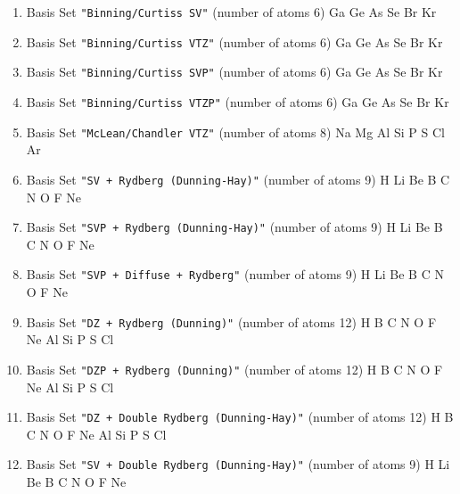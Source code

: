 \begin{enumerate}
\item Basis Set \verb#"Binning/Curtiss SV"# (number of atoms 6)  \newline
  Ga Ge As Se Br Kr

\item Basis Set \verb#"Binning/Curtiss VTZ"# (number of atoms 6)  \newline
  Ga Ge As Se Br Kr


\item Basis Set \verb#"Binning/Curtiss SVP"# (number of atoms 6)  \newline
  Ga Ge As Se Br Kr


\item Basis Set \verb#"Binning/Curtiss VTZP"# (number of atoms 6)  \newline
  Ga Ge As Se Br Kr


\item Basis Set \verb#"McLean/Chandler VTZ"# (number of atoms 8)  \newline
  Na Mg Al Si P S Cl Ar


\item Basis Set \verb#"SV + Rydberg (Dunning-Hay)"# (number of atoms 9)  \newline
  H Li Be B C N O F Ne


\item Basis Set \verb#"SVP + Rydberg (Dunning-Hay)"# (number of atoms 9)  \newline
  H Li Be B C N O F Ne


\item Basis Set \verb#"SVP + Diffuse + Rydberg"# (number of atoms 9)  \newline
  H Li Be B C N O F Ne


\item Basis Set \verb#"DZ + Rydberg (Dunning)"# (number of atoms 12)  \newline
  H B C N O F Ne Al Si P S Cl


\item Basis Set \verb#"DZP + Rydberg (Dunning)"# (number of atoms 12)  \newline
  H B C N O F Ne Al Si P S Cl


\item Basis Set \verb#"DZ + Double Rydberg (Dunning-Hay)"# (number of atoms 12)  \newline
  H B C N O F Ne Al Si P S Cl

\item Basis Set \verb#"SV + Double Rydberg (Dunning-Hay)"# (number of atoms 9)  \newline
  H Li Be B C N O F Ne



\end{enumerate}
